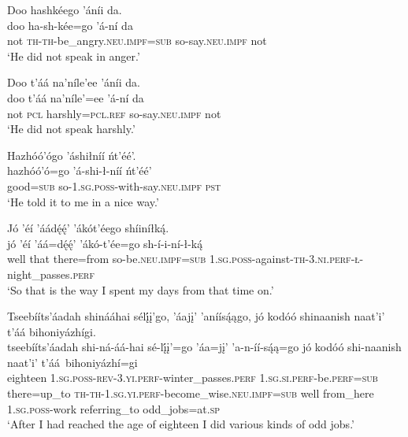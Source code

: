\ea\label{ex:text1-7-3}
Doo hashkéego ’áníi da.\\
\gll doo	ha-sh-kée=go	’á-ní	da\\
     not	\textsc{th}-\textsc{th}-be\_angry.\textsc{neu}.\textsc{impf}=\textsc{sub}	so-say.\textsc{neu}.\textsc{impf}	not\\
\glt `He did not speak in anger.'
\z

\ea\label{ex:text1-7-4}
Doo t’áá na’níle’ee ’áníi da.\\
\gll doo	t’áá	na’níle’=ee	’á-ní	da\\
     not	\textsc{pcl}	harshly=\textsc{pcl}.\textsc{ref}	so-say.\textsc{neu}.\textsc{impf}	not\\
\glt `He did not speak harshly.'
\z

\ea\label{ex:text1-7-5}
Hazhóó’ógo ’áshiłníí ńt’éé’.\\
\gll hazhóó’ó=go	’á-shi-ł-níí	ńt’éé’\\
     good=\textsc{sub}	so-1.\textsc{sg}.\textsc{poss}-with-say.\textsc{neu}.\textsc{impf}	\textsc{pst}\\
\glt `He told it to me in a nice way.'
\z

\ea\label{ex:text1-7-6}
Jó ’éí ’áádę́ę́’ ’ákót’éego shíiníłką́.\\
\gll jó	’éí	’áá=dę́ę́’	’ákó-t’ée=go	sh-í-i-ní-ł-ką́\\
     well	that	there=from	so-be.\textsc{neu}.\textsc{impf}=\textsc{sub}	1.\textsc{sg}.\textsc{poss}-against-\textsc{th}-3.\textsc{ni}.\textsc{perf}-\textsc{ł}-night\_passes.\textsc{perf}\\
\glt `So that is the way I spent my days from that time on.'
\z

\ea\label{ex:text1-8-1}
Tseebííts’áadah shinááhai sélį́į’go, ’áajį’ ’aníísą́ągo, jó kodóó shinaanish naat’i’ t’áá bihoniyázhígi.\\
\gll tseebííts’áadah	shi-ná-áá-hai	sé-lį́į’=go	’áa=jį’	’a-n-íí-są́ą=go	jó	kodóó	shi-naanish	naat’i’	t’áá~{bihoniyázhí=gi}\\
     eighteen	1.\textsc{sg}.\textsc{poss}-\textsc{rev}-3.\textsc{yi}.\textsc{perf}-winter\_passes.\textsc{perf}	1.\textsc{sg}.\textsc{si}.\textsc{perf}-be.\textsc{perf}=\textsc{sub}	there=up\_to	\textsc{th}-\textsc{th}-1.\textsc{sg}.\textsc{yi}.\textsc{perf}-become\_wise.\textsc{neu}.\textsc{impf}=\textsc{sub}	well	from\_here	1.\textsc{sg}.\textsc{poss}-work	referring\_to	odd\_jobs=at.\textsc{sp}\\
\glt `After I had reached the age of eighteen I did various kinds of odd jobs.'
\z


